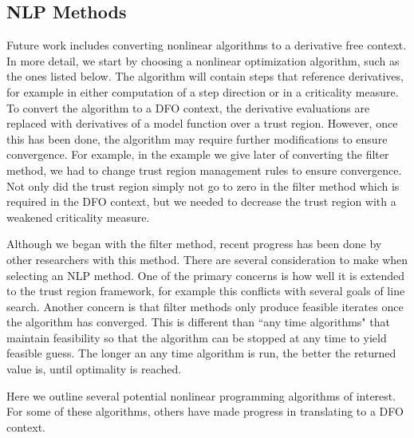 \documentclass{article}
\begin{document}
\subsection{NLP Methods}

Future work includes converting nonlinear algorithms to a derivative free context.
In more detail, we start by choosing a nonlinear optimization algorithm, such as the ones listed below.
The algorithm will contain steps that reference derivatives, for example in either computation of a step direction or in a criticality measure.
To convert the algorithm to a DFO context, the derivative evaluations are replaced with derivatives of a model function over a trust region.
However, once this has been done, the algorithm may require further modifications to ensure convergence.
For example, in the example we give later of converting the filter method, we had to change trust region management rules to ensure convergence.
Not only did the trust region simply not go to zero in the filter method which is required in the DFO context, but we needed to decrease the trust region with a weakened criticality measure.


Although we began with the filter method, recent progress has been done by other researchers with this method.
There are several consideration to make when selecting an NLP method.
One of the primary concerns is how well it is extended to the trust region framework, for example this conflicts with several goals of line search.
Another concern is that filter methods only produce feasible iterates once the algorithm has converged.
This is different than ``any time algorithms" that maintain feasibility so that the algorithm can be stopped at any time to yield feasible guess.
The longer an any time algorithm is run, the better the returned value is, until optimality is reached.

Here we outline several potential nonlinear programming algorithms of interest.
For some of these algorithms, others have made progress in translating to a DFO context.
\end{document}
